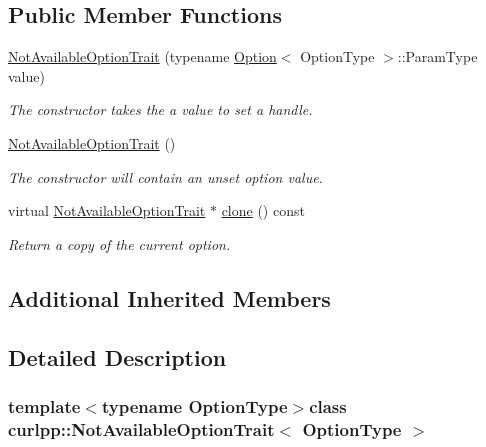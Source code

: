 \subsection*{Public Member Functions}
\begin{DoxyCompactItemize}
\item 
\hypertarget{classcurlpp_1_1NotAvailableOptionTrait_ab2f2afb821939afcac64dccc67bd6883}{\hyperlink{classcurlpp_1_1NotAvailableOptionTrait_ab2f2afb821939afcac64dccc67bd6883}{Not\-Available\-Option\-Trait} (typename \hyperlink{classcurlpp_1_1Option}{Option}$<$ Option\-Type $>$\-::Param\-Type value)}\label{classcurlpp_1_1NotAvailableOptionTrait_ab2f2afb821939afcac64dccc67bd6883}

\begin{DoxyCompactList}\small\item\em The constructor takes the a value to set a handle. \end{DoxyCompactList}\item 
\hyperlink{classcurlpp_1_1NotAvailableOptionTrait_adfbbdcb4d7062a7c5c5219b7231e6614}{Not\-Available\-Option\-Trait} ()
\begin{DoxyCompactList}\small\item\em The constructor will contain an unset option value. \end{DoxyCompactList}\item 
virtual \hyperlink{classcurlpp_1_1NotAvailableOptionTrait}{Not\-Available\-Option\-Trait} $\ast$ \hyperlink{classcurlpp_1_1NotAvailableOptionTrait_a61926d7006918817fc77e172687d2cdd}{clone} () const 
\begin{DoxyCompactList}\small\item\em Return a copy of the current option. \end{DoxyCompactList}\end{DoxyCompactItemize}
\subsection*{Additional Inherited Members}


\subsection{Detailed Description}
\subsubsection*{template$<$typename Option\-Type$>$class curlpp\-::\-Not\-Available\-Option\-Trait$<$ Option\-Type $>$}


